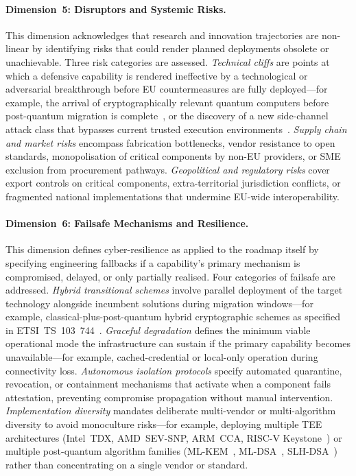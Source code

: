 \paragraph{Dimension~5: Disruptors and Systemic Risks.}
This dimension acknowledges that research and innovation trajectories are non-linear by identifying risks that could render planned deployments obsolete or unachievable. Three risk categories are assessed. \textit{Technical cliffs} are points at which a defensive capability is rendered ineffective by a technological or adversarial breakthrough before EU countermeasures are fully deployed---for example, the arrival of cryptographically relevant quantum computers before post-quantum migration is complete~\cite{nistir8413}, or the discovery of a new side-channel attack class that bypasses current trusted execution environments~\cite{keystone}. \textit{Supply chain and market risks} encompass fabrication bottlenecks, vendor resistance to open standards, monopolisation of critical components by non-EU providers, or SME exclusion from procurement pathways. \textit{Geopolitical and regulatory risks} cover export controls on critical components, extra-territorial jurisdiction conflicts, or fragmented national implementations that undermine EU-wide interoperability.

\paragraph{Dimension~6: Failsafe Mechanisms and Resilience.}
This dimension defines cyber-resilience as applied to the roadmap itself by specifying engineering fallbacks if a capability's primary mechanism is compromised, delayed, or only partially realised. Four categories of failsafe are addressed. \textit{Hybrid transitional schemes} involve parallel deployment of the target technology alongside incumbent solutions during migration windows---for example, classical-plus-post-quantum hybrid cryptographic schemes as specified in ETSI~TS~103~744~\cite{etsi103744}. \textit{Graceful degradation} defines the minimum viable operational mode the infrastructure can sustain if the primary capability becomes unavailable---for example, cached-credential or local-only operation during connectivity loss. \textit{Autonomous isolation protocols} specify automated quarantine, revocation, or containment mechanisms that activate when a component fails attestation, preventing compromise propagation without manual intervention. \textit{Implementation diversity} mandates deliberate multi-vendor or multi-algorithm diversity to avoid monoculture risks---for example, deploying multiple TEE architectures (Intel~TDX, AMD~SEV-SNP, ARM~CCA, RISC-V Keystone~\cite{keystone}) or multiple post-quantum algorithm families (ML-KEM~\cite{fips203}, ML-DSA~\cite{fips204}, SLH-DSA~\cite{fips205}) rather than concentrating on a single vendor or standard.


